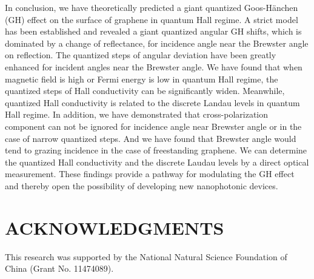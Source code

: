 \documentclass[twocolumn,showpacs,preprintnumbers,amsmath,amssymb]{revtex4}
\begin{document}
In conclusion, we have theoretically predicted a giant quantized Goos-H\"{a}nchen (GH) effect on the surface of graphene in quantum Hall regime.
A strict model has been established and revealed a giant quantized angular GH shifts,
which is dominated by a change of reflectance,
for incidence angle near the Brewster angle on reflection.
The quantized steps of angular deviation have been greatly enhanced for incident angles near the Brewster angle.
We have found that when
magnetic field is high or Fermi energy is low in quantum Hall regime,
the quantized steps of Hall conductivity can be significantly widen.
Meanwhile, quantized Hall conductivity is related to the discrete Landau levels in quantum Hall regime.
In addition, we have demonstrated that cross-polarization component can not be ignored for incidence angle near Brewster angle or in the case of narrow quantized steps.
And we have found that Brewster angle would tend to grazing incidence in the case of freestanding graphene.
We can determine the quantized Hall conductivity and the discrete Laudau levels by a direct optical measurement.
These findings provide a pathway for modulating the GH effect and
thereby open the possibility of developing new nanophotonic devices.


\section*{ACKNOWLEDGMENTS}
This research was supported by the National Natural Science
Foundation of China (Grant No. 11474089).
\end{document}
